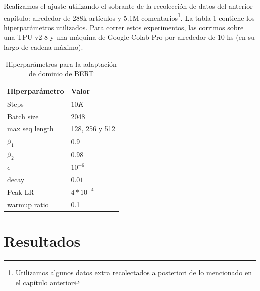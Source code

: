 Realizamos el ajuste utilizando el sobrante de la recolección de datos del anterior capítulo: alrededor de 288k artículos y 5.1M comentarios\footnote{Utilizamos algunos datos extra recolectados a posteriori de lo mencionado en el capítulo anterior}. La tabla \ref{tab:hs_ft_hyperparameter} contiene los hiperparámetros utilizados. Para correr estos experimentos, las corrimos sobre una TPU v2-8 y una máquina de Google Colab Pro por alrededor de 10 hs (en su largo de cadena máximo).

\begin{table}[t]
    \centering
    \begin{tabular}{ll}
        \toprule
        Hiperparámetro & Valor         \\
        \midrule
        Steps          & $10K$           \\
        Batch size     & 2048            \\
        max seq length & 128, 256 y 512  \\
        $\beta_1$      & $0.9$           \\
        $\beta_2$      & $0.98$          \\
        $\epsilon$     & $10^{-6}$       \\
        decay          & $0.01$          \\
        Peak LR        & $4*10^{-4}$     \\
        warmup ratio   & 0.1             \\
        \bottomrule
    \end{tabular}
    \caption{Hiperparámetros para la adaptación de dominio de BERT}
    \label{tab:hs_ft_hyperparameter}
\end{table}


\section{Resultados}


